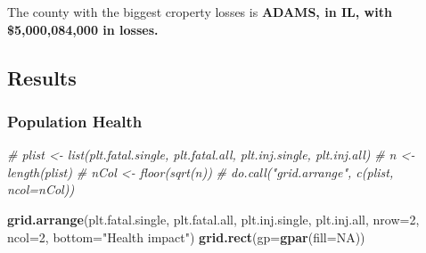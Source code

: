 \documentclass[]{article}
\newenvironment{Shaded}{\begin{snugshade}}{\end{snugshade}}
\newcommand{\KeywordTok}[1]{\textcolor[rgb]{0.13,0.29,0.53}{\textbf{{#1}}}}
\newcommand{\DataTypeTok}[1]{\textcolor[rgb]{0.13,0.29,0.53}{{#1}}}
\newcommand{\DecValTok}[1]{\textcolor[rgb]{0.00,0.00,0.81}{{#1}}}
\newcommand{\StringTok}[1]{\textcolor[rgb]{0.31,0.60,0.02}{{#1}}}
\newcommand{\CommentTok}[1]{\textcolor[rgb]{0.56,0.35,0.01}{\textit{{#1}}}}
\newcommand{\OtherTok}[1]{\textcolor[rgb]{0.56,0.35,0.01}{{#1}}}
\newcommand{\NormalTok}[1]{{#1}}
\begin{document}
\begin{Shaded}
\end{Shaded}

The county with the biggest croperty losses is \textbf{ADAMS, in IL,
with \$5,000,084,000 in losses.}

\subsection{Results}\label{results}

\subsubsection{Population Health}\label{population-health}

\begin{Shaded}
\begin{Highlighting}[]
\CommentTok{# plist <- list(plt.fatal.single, plt.fatal.all, plt.inj.single, plt.inj.all)}
\CommentTok{# n <- length(plist)}
\CommentTok{# nCol <- floor(sqrt(n))}
\CommentTok{# do.call("grid.arrange", c(plist, ncol=nCol))}

\KeywordTok{grid.arrange}\NormalTok{(plt.fatal.single, plt.fatal.all, plt.inj.single, plt.inj.all, }
             \DataTypeTok{nrow=}\DecValTok{2}\NormalTok{, }\DataTypeTok{ncol=}\DecValTok{2}\NormalTok{,}
             \DataTypeTok{bottom=}\StringTok{"Health impact"}\NormalTok{)}
\KeywordTok{grid.rect}\NormalTok{(}\DataTypeTok{gp=}\KeywordTok{gpar}\NormalTok{(}\DataTypeTok{fill=}\OtherTok{NA}\NormalTok{))}
\end{Highlighting}
\end{Shaded}
\end{document}
